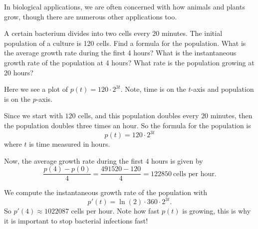 In biological applications, we are often concerned with how animals
and plants grow, though there are numerous other applications too.

\begin{example}
A certain bacterium divides into two cells every 20 minutes. The
initial population of a culture is 120 cells. Find a formula for the
population.  What is the average growth rate during the first 4 hours?
What is the instantaneous growth rate of the population at 4 hours?
What rate is the population growing at 20 hours?
\end{example}
\begin{marginfigure}
\caption{Here we see a plot of $p(t) = 120\cdot 2^{3t}$. Note, time is on
  the $t$-axis and population is on the $p$-axis.}
\end{marginfigure}


\begin{solution}
Since we start with $120$ cells, and this population doubles every $20$
minutes, then the population doubles three times an hour. So the
formula for the population is
\[
p(t) = 120\cdot 2^{3t}
\]
where $t$ is time measured in hours.

Now, the average growth rate during the first $4$ hours is given by
\[
\frac{p(4)-p(0)}{4} =\frac{491520-120}{4} = 122850~\text{cells per hour.}
\]

We compute the instantaneous growth rate of the population with
\[
p'(t) = \ln(2)\cdot 360\cdot 2^{3t}.
\]
So $p'(4) \approx 1022087$ cells per hour. Note how fast $p(t)$ is
growing, this is why it is important to stop bacterial infections
fast!
\end{solution}



